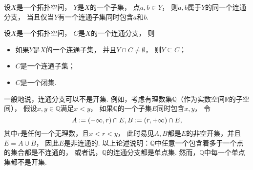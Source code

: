 \begin{proposition}
设\(X\)是一个拓扑空间，
\(Y\)是\(X\)的一个子集，
点\(a,b \in Y\)，
则\(a,b\)属于\(Y\)的同一个连通分支，
当且仅当\(Y\)有一个连通子集同时包含\(a\)和\(b\).
\end{proposition}

\begin{theorem}
设\(X\)是一个拓扑空间，
\(C\)是\(X\)的一个连通分支，
则\begin{itemize}
	\item 如果\(Y\)是\(X\)的一个连通子集，
	并且\(Y \cap C \neq \emptyset\)，
	则\(Y \subseteq C\)；

	\item \(C\)是一个连通子集；

	\item \(C\)是一个闭集.
\end{itemize}
\end{theorem}

一般地说，连通分支可以不是开集.
例如，考虑有理数集\(\mathbb{Q}\)（作为实数空间\(\mathbb{R}\)的子空间），
假设\(x,y\in\mathbb{Q}\)满足\(x<y\)，
如果\(\mathbb{Q}\)的一个子集\(E\)同时包含\(x,y\)，
令\begin{equation*}
	A := (-\infty,r) \cap E,
	B := (r,+\infty) \cap E,
\end{equation*}
其中\(r\)是任何一个无理数，且\(x<r<y\)，
此时易见\(A,B\)都是\(E\)的非空开集，并且\(E = A \cup B\)，
因此\(E\)是非连通的.
以上论述说明：\(\mathbb{Q}\)中任意一个包含着多于一个点的集合都是不连通的，
或者说，\(\mathbb{Q}\)的连通分支都是单点集.
然而，\(\mathbb{Q}\)中每一个单点集都不是开集.

